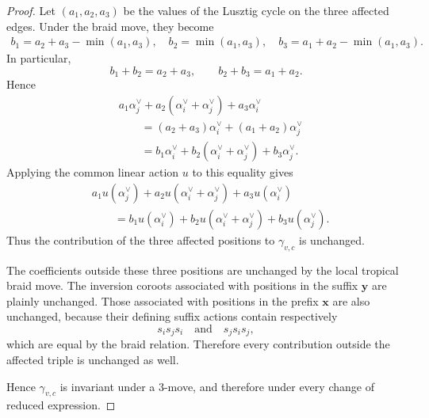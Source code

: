 \documentclass[10pt,a4paper]{amsart}
\begin{document}
\begin{proof}
Let \((a_1,a_2,a_3)\) be the values of the Lusztig cycle on the three
affected edges. Under the braid move, they become
\[
\begin{aligned}
    b_1=a_2+a_3-\min(a_1,a_3),\quad
    b_2=\min(a_1,a_3),\quad
    b_3=a_1+a_2-\min(a_1,a_3).
\end{aligned}
\]
In particular,
\[
    b_1+b_2=a_2+a_3,
    \qquad
    b_2+b_3=a_1+a_2.
\]
Hence
\begin{align*}
    &a_1\alpha_j^\vee
     +a_2(\alpha_i^\vee+\alpha_j^\vee)
     +a_3\alpha_i^\vee\\
    &\qquad
     =(a_2+a_3)\alpha_i^\vee
       +(a_1+a_2)\alpha_j^\vee\\
    &\qquad
     =b_1\alpha_i^\vee
       +b_2(\alpha_i^\vee+\alpha_j^\vee)
       +b_3\alpha_j^\vee.
\end{align*}
Applying the common linear action \(u\) to this equality gives
\begin{align*}
    &a_1u(\alpha_j^\vee)
     +a_2u(\alpha_i^\vee+\alpha_j^\vee)
     +a_3u(\alpha_i^\vee)\\
    &\qquad
     =b_1u(\alpha_i^\vee)
       +b_2u(\alpha_i^\vee+\alpha_j^\vee)
       +b_3u(\alpha_j^\vee).
\end{align*}
Thus the contribution of the three affected positions to
\(\gamma_{v,c}\) is unchanged.

The coefficients outside these three positions are unchanged by the
local tropical braid move. The inversion coroots associated with
positions in the suffix \(\mathbf y\) are plainly unchanged. Those
associated with positions in the prefix \(\mathbf x\) are also
unchanged, because their defining suffix actions contain respectively
\[
    s_is_js_i
    \quad\text{and}\quad
    s_js_is_j,
\]
which are equal by the braid relation. Therefore every contribution
outside the affected triple is unchanged as well.

Hence \(\gamma_{v,c}\) is invariant under a \(3\)-move, and therefore
under every change of reduced expression.
\end{proof}
\end{document}
